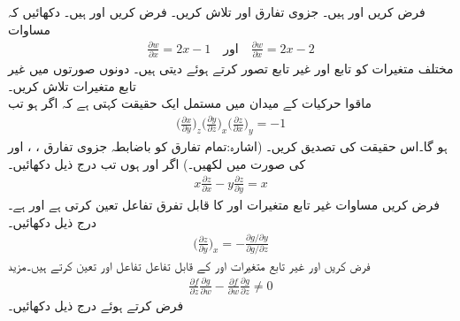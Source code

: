 فرض کریں  اور  ہیں۔ جزوی تفارق   اور 
 تلاش کریں۔
فرض کریں  اور  ہیں۔ دکھائیں کہ مساوات
\begin{align*}
\tfrac{\partial w}{\partial x}=2x-1\quad \text{اور}\quad \tfrac{\partial w}{\partial x}=2x-2
\end{align*}
مختلف متغیرات کو تابع اور غیر تابع تصور کرتے ہوئے    دیتی ہیں۔ دونوں صورتوں  میں غیر تابع متغیرات تلاش کریں۔
\\
ماقوا حرکیات  کے میدان میں    مستمل  ایک حقیقت کہتی ہے کہ اگر  ہو تب
\begin{align*}
\big(\frac{\partial x}{\partial y}\big)_z \big(\frac{\partial y}{\partial z}\big)_x  \big(\frac{\partial z}{\partial x}\big)_y=-1
\end{align*}
ہو گا۔اس حقیقت  کی تصدیق کریں۔ (اشارہ:تمام تفارق کو باضابطہ جزوی تفارق ،   ، اور  کی صورت میں لکھیں۔)
اگر   اور  ہوں تب درج ذیل دکھائیں۔
\begin{align*}
x\frac{\partial z}{\partial x}-y\frac{\partial z}{\partial y}=x
\end{align*}
فرض کریں  مساوات   غیر تابع متغیرات  اور  کا قابل تفرق تفاعل  تعین کرتی ہے اور  ہے۔ درج ذیل دکھائیں۔
\begin{align*}
\big(\frac{\partial z}{\partial y}\big)_x=-\frac{\partial g/\partial y}{\partial g/\partial z}
\end{align*}
فرض کریں   اور   غیر تابع متغیرات   اور   کے قابل  تفاعل تفاعل  اور  تعین کرتے  ہیں۔مزید  
\begin{align*}
\frac{\partial f}{\partial z}\frac{\partial g}{\partial w}-\frac{\partial f}{\partial w}\frac{\partial g}{\partial z}\ne 0
\end{align*}
فرض کرتے ہوئے درج ذیل دکھائیں۔

